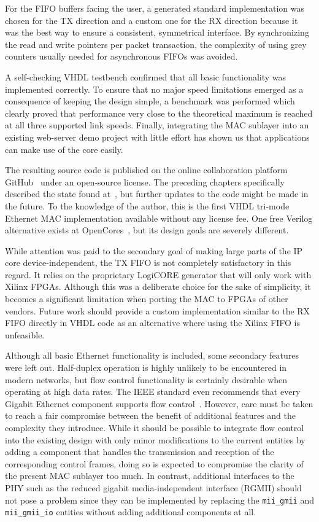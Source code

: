 \documentclass[a4paper, 11pt, oneside]{Thesis}  %
\begin{document}
For the FIFO buffers facing the user, a generated standard implementation was chosen for the TX direction and a custom one for the RX direction because it was the best way to ensure a consistent, symmetrical interface. By synchronizing the read and write pointers per packet transaction, the complexity of using grey counters usually needed for asynchronous FIFOs was avoided.

A self-checking VHDL testbench confirmed that all basic functionality was implemented correctly. To 
ensure that no major speed limitations emerged as a consequence of keeping the design simple, a benchmark was performed which clearly proved that performance very close to the theoretical maximum is reached at all three supported link speeds. Finally, integrating the MAC sublayer into an existing web-server demo project with little effort has shown us that applications can make use of the core easily.

The resulting source code is published on the online collaboration platform GitHub~\cite{GithubMAC} under an open-source license. The preceding chapters specifically described the state found at~\cite{GithubMACCommit}, but further updates to the code might be made in the future. To the knowledge of the author, this is the first VHDL tri-mode Ethernet MAC implementation available without any license fee. One free Verilog alternative exists at OpenCores~\cite{MAC_opencores}, but its design goals are severely different.

While attention was paid to the secondary goal of making large parts of the IP core device-independent, the TX FIFO is not completely satisfactory in this regard. It relies on the proprietary LogiCORE generator that will only work with Xilinx FPGAs. Although this was a deliberate choice for the sake of simplicity, it becomes a significant limitation when porting the MAC to FPGAs of other vendors. Future work should provide a custom implementation similar to the RX FIFO directly in VHDL code as an alternative where using the Xilinx FIFO is unfeasible.

Although all basic Ethernet functionality is included, some secondary features were left out. Half-duplex operation is highly unlikely to be encountered in modern networks, but flow control functionality is certainly desirable when operating at high data rates. The IEEE standard even recommends that every Gigabit Ethernet component supports flow control~\cite{heiseEthernet}. However, care must be taken to reach a fair compromise between the benefit of additional features and the complexity they introduce. While it should be possible to integrate flow control into the existing design with only minor modifications to the current entities by adding a component that handles the transmission and reception of the corresponding control frames, doing so is expected to compromise the clarity of the present MAC sublayer too much. In contrast, additional interfaces to the PHY such as the reduced gigabit media-independent interface (RGMII) should not pose a problem since they can be implemented by replacing the \texttt{mii\_gmii} and \texttt{mii\_gmii\_io} entities without adding additional components at all.
\end{document}

